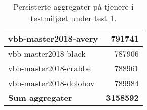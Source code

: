 \begin{table}[hbtp]
  \begin{center}
    \begin{tabular}{ | l | r |}
      \hline
      vbb-master2018-avery & 791741 \\ \hline
      vbb-master2018-black & 787906 \\ \hline
      vbb-master2018-crabbe & 788961 \\ \hline
      vbb-master2018-dolohov & 789984 \\ \hline
      \textbf{Sum aggregater} & \textbf{3158592} \\ \hline
    \end{tabular}
  \end{center}
  \caption{Persisterte aggregater på tjenere i testmiljøet under test 1.}
  \label{backend1}
\end{table}
